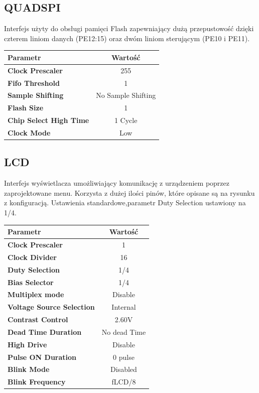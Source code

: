 \documentclass[10pt, a4paper]{article}
\begin{document}
\subsection{QUADSPI}
Interfejs użyty do obsługi pamięci Flash zapewniający dużą przepustowość dzięki czterem liniom danych (PE12:15) oraz dwóm liniom sterującym (PE10 i PE11).
\begin{table}[H]
\centering
\begin{tabular}{|l|c|}
\hline
\textbf{Parametr} & Wartość \\
\hline
\hline
\textbf{Clock Prescaler} & 255\\ \hline
\textbf{Fifo Threshold} & 1\\ \hline
\textbf{Sample Shifting} & No Sample Shifting \\ \hline
\textbf{Flash Size} & 1 \\ \hline
\textbf{Chip Select High Time} & 1 Cycle \\ \hline
\textbf{Clock Mode} & Low \\ \hline
\end{tabular}
\end{table}


\subsection{LCD}
Interfejs wyświetlacza umożliwiający komunikację z urządzeniem poprzez zaprojektowane menu. Korzysta z dużej ilości pinów, które opisane są na rysunku z konfiguracją. Ustawienia standardowe,parametr Duty Selection ustawiony na 1/4.

\begin{table}[H]
\centering
\begin{tabular}{|l|c|}
\hline
\textbf{Parametr} & Wartość \\
\hline
\hline
\textbf{Clock Prescaler} & 1 \\ \hline
\textbf{Clock Divider} & 16\\ \hline
\textbf{Duty Selection} & 1/4\\ \hline
\textbf{Bias Selector} & 1/4\\ \hline
\textbf{Multiplex mode} & Disable\\ \hline
\textbf{Voltage Source Selection} & Internal\\ \hline
\textbf{Contrast Control} & 2.60V\\ \hline
\textbf{Dead Time Duration} & No dead Time\\ \hline
\textbf{High Drive} & Disable\\ \hline
\textbf{Pulse ON Duration} & 0 pulse\\ \hline
\textbf{Blink Mode} & Disabled\\ \hline
\textbf{Blink Frequency} & fLCD/8\\ \hline

\end{tabular}
\end{table}
\end{document}
